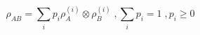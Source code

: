 \begin{equation}\label{eqn:rho_sep}
\rho_{AB} = \sum_i p_i \rho_A^{(i)} \otimes \rho_B ^{(i)} \; ,    \sum_i p_i =1 \; , p_i \geq 0
\end{equation}
